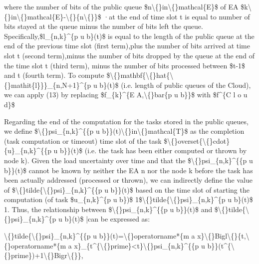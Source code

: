 \documentclass{article}
\begin{document}
where the number of bits of the public queue \$n\textbackslash\{\}in\textbackslash\{\}mathcal\{E\}\$ of EA \$k\textbackslash\{\}in\textbackslash\{\}mathcal\{E\}-\textbackslash\{\}\{n\textbackslash\{\}\}\$ ·at the end of time slot t is equal to number of bits stayed at the queue minus the number of bits left the queue. Specifically,\$l\_\{n,k\}\textasciicircum{}\{p u b\}(t)\$ is equal to the length of the public queue at the end of the previous time slot (first term),plus the number of bits arrived at time slot t (second term),minus the number of bits dropped by the queue at the end of the time slot t (third term), minus the number of bits processed between \$t-1\$ and t (fourth term). To compute \$\textbackslash\{\}mathbf\{\textbackslash\{\}hat\{\textbackslash\{\}mathit\{l\}\}\}\_\{n,N+1\}\textasciicircum{}\{p u b\}(t)\$ (i.e. length of public queues of the Cloud), we can apply (13) by replacing \$f\_\{k\}\textasciicircum{}\{E A,\textbackslash\{\}bar\{p u b\}\}\$ with \$f\textasciicircum{}\{C l o u d\}\$

Regarding the end of the computation for the tasks stored in the public queues, we define \$\textbackslash\{\}psi\_\{n,k\}\textasciicircum{}\{\{p u b\}\}(t)\textbackslash\{\}in\textbackslash\{\}mathcal\{T\}\$ as the completion (task computation or timeout) time slot of the task \$\textbackslash\{\}overset\{\textbackslash\{\}cdot\}\{u\}\_\{n,k\}\textasciicircum{}\{\{p u b\}\}(t)\$ (i.e. the task has been either computed or thrown by node k). Given the load uncertainty over time and that the \$\textbackslash\{\}psi\_\{n,k\}\textasciicircum{}\{\{p u b\}\}(t)\$ cannot be known by neither the EA n nor the node k before the task has been actually addressed (processed or thrown), we can indirectly define the value of \$\textbackslash\{\}tilde\{\textbackslash\{\}psi\}\_\{n,k\}\textasciicircum{}\{\{p u b\}\}(t)\$ based on the time slot of starting the computation (of task \$u\_\{n,k\}\textasciicircum{}\{p u b\})\$ 1\$\textbackslash\{\}tilde\{\textbackslash\{\}psi\}\_\{n,k\}\textasciicircum{}\{p u b\}(t)\$ 1. Thus, the relationship between \$\textbackslash\{\}psi\_\{n,k\}\textasciicircum{}\{\{p u b\}\}(t)\$ and \$\textbackslash\{\}tilde\{\textbackslash\{\}psi\}\_\{n,k\}\textasciicircum{}\{p u b\}(t)\$ |can be expressed as:

\textbackslash\{\}tilde\{\textbackslash\{\}psi\}\_\{n,k\}\textasciicircum{}\{\{p u b\}\}(t)=\textbackslash\{\}operatorname*\{m a x\}\textbackslash\{\}Bigl\textbackslash\{\}\{t,\textbackslash\{\}operatorname*\{m a x\}\_\{t\textasciicircum{}\{\textbackslash\{\}prime\}<t\}\textbackslash\{\}psi\_\{n,k\}\textasciicircum{}\{\{p u b\}\}(t\textasciicircum{}\{\textbackslash\{\}prime\})+1\textbackslash\{\}Bigr\textbackslash\{\}\},
\end{document}
